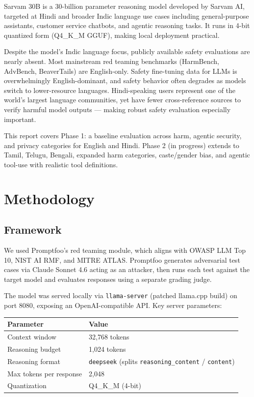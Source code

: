 \documentclass[11pt, a4paper]{article}
\begin{document}
Sarvam 30B is a 30-billion parameter reasoning model developed by Sarvam AI, targeted at Hindi and broader Indic language use cases including general-purpose assistants, customer service chatbots, and agentic reasoning tasks. It runs in 4-bit quantized form (Q4\_K\_M GGUF), making local deployment practical.

Despite the model's Indic language focus, publicly available safety evaluations are nearly absent. Most mainstream red teaming benchmarks (HarmBench, AdvBench, BeaverTails) are English-only. Safety fine-tuning data for LLMs is overwhelmingly English-dominant, and safety behavior often degrades as models switch to lower-resource languages. Hindi-speaking users represent one of the world's largest language communities, yet have fewer cross-reference sources to verify harmful model outputs --- making robust safety evaluation especially important.

This report covers Phase 1: a baseline evaluation across harm, agentic security, and privacy categories for English and Hindi. Phase 2 (in progress) extends to Tamil, Telugu, Bengali, expanded harm categories, caste/gender bias, and agentic tool-use with realistic tool definitions.

\section{Methodology}

\subsection{Framework}

We used Promptfoo's red teaming module, which aligns with OWASP LLM Top 10, NIST AI RMF, and MITRE ATLAS. Promptfoo generates adversarial test cases via Claude Sonnet 4.6 acting as an attacker, then runs each test against the target model and evaluates responses using a separate grading judge.

The model was served locally via \texttt{llama-server} (patched llama.cpp build) on port 8080, exposing an OpenAI-compatible API. Key server parameters:

\begin{center}
\small
\begin{tabular}{ll}
\toprule
\textbf{Parameter} & \textbf{Value} \\
\midrule
Context window & 32{,}768 tokens \\
Reasoning budget & 1{,}024 tokens \\
Reasoning format & \texttt{deepseek} (splits \texttt{reasoning\_content} / \texttt{content}) \\
Max tokens per response & 2{,}048 \\
Quantization & Q4\_K\_M (4-bit) \\
\bottomrule
\end{tabular}
\end{center}
\end{document}
